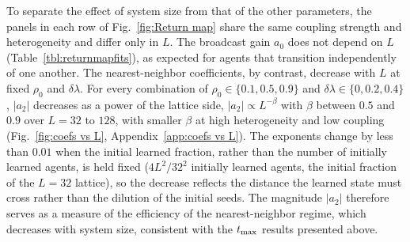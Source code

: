\documentclass[a4paper,fleqn]{cas-sc}
\begin{document}
    To separate the effect of system size from that of the other parameters, the panels in each row of Fig.~\ref{fig:Return map} share the same coupling strength and heterogeneity and differ only in $L$.
    The broadcast gain $a_0$ does not depend on $L$ (Table~\ref{tbl:returnmapfits}), as expected for agents that transition independently of one another.
    The nearest-neighbor coefficients, by contrast, decrease with $L$ at fixed $\rho_0$ and $\delta\lambda$.
    For every combination of $\rho_0\in\{0.1,0.5,0.9\}$ and $\delta\lambda\in\{0,0.2,0.4\}$, $|a_2|$ decreases as a power of the lattice side, $|a_2|\propto L^{-\beta}$ with $\beta$ between $0.5$ and $0.9$ over $L=32$ to $128$, with smaller $\beta$ at high heterogeneity and low coupling (Fig.~\ref{fig:coefs vs L}, Appendix~\ref{app:coefs vs L}).
    The exponents change by less than $0.01$ when the initial learned fraction, rather than the number of initially learned agents, is held fixed ($4L^2/32^2$ initially learned agents, the initial fraction of the $L=32$ lattice), so the decrease reflects the distance the learned state must cross rather than the dilution of the initial seeds.
    The magnitude $|a_2|$ therefore serves as a measure of the efficiency of the nearest-neighbor regime, which decreases with system size, consistent with the $t_{\rm max}$ results presented above.
\end{document}
